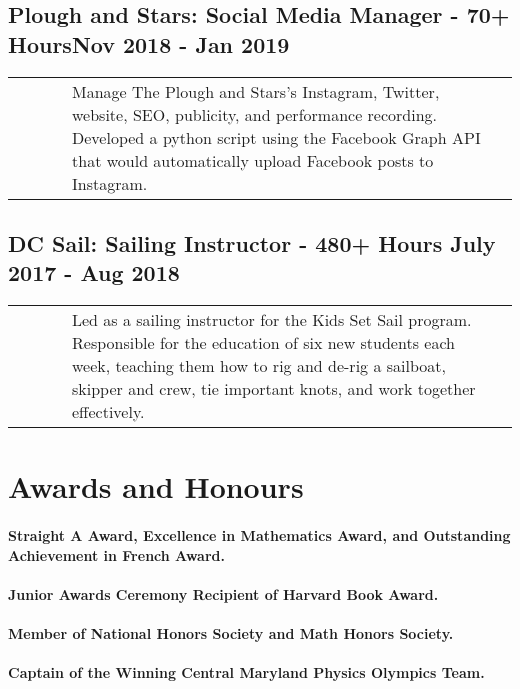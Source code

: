 \documentclass{article}
\begin{document}
\subsection{Plough and Stars: Social Media Manager - 70+ Hours\hfill Nov 2018 - Jan 2019\newline}

\begin{tabularx}{\linewidth}{ @{} l X r @{} }
\ \ \ \ \ & Manage The Plough and Stars’s Instagram, Twitter, website, SEO, publicity, and performance recording. Developed a python script using the Facebook Graph API that would automatically upload Facebook posts to Instagram.
\end{tabularx}

\subsection{DC Sail: Sailing Instructor - 480+ Hours \hfill July 2017 - Aug 2018\newline}

\begin{tabularx}{\linewidth}{ @{} l X r @{} }
\ \ \ \ \ & Led as a sailing instructor for the Kids Set Sail program. Responsible for the education of six new students each week,  teaching them how to rig and de-rig a sailboat,  skipper and crew,  tie important knots, and work together effectively.
\end{tabularx}

\section{Awards and Honours}

\paragraph{Straight A Award, Excellence in Mathematics Award, and Outstanding Achievement in French Award.}

\paragraph{Junior Awards Ceremony Recipient of Harvard Book Award.}

\paragraph{Member of National Honors Society and Math Honors Society.}

\paragraph{Captain of the Winning Central Maryland Physics Olympics Team.}
\end{document}
